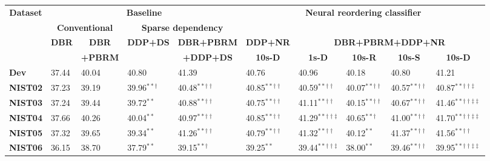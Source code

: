 \documentclass[letterpaper]{article}
\begin{document}
\begin{table}[ht]
\centering
\small
\begin{tabular}{|l|l|l||l|l||l|l|l|l|l|}
\hline
\multicolumn{1}{|c|}{\multirow{4}{*}{\bf Dataset}} & \multicolumn{4}{c||}{\bf Baseline} & \multicolumn{5}{c|}{\multirow{2}{*}{\bf Neural reordering classifier}} \\\cline{2-5}
 & \multicolumn{2}{c||}{\bf Conventional} & \multicolumn{2}{c||}{\bf Sparse dependency} &  \multicolumn{5}{c|}{} \\\cline{2-10}
 & \multicolumn{1}{c|}{\multirow{2}{*}{\bf DBR}} & \multicolumn{1}{c||}{\bf DBR} & \multicolumn{1}{c|}{\multirow{2}{*}{\bf DDP+DS}} & \multicolumn{1}{c||}{\bf DBR+PBRM} & \multicolumn{1}{c|}{\bf DDP+NR} & \multicolumn{4}{c|}{\bf DBR+PBRM+DDP+NR} \\\cline{6-10}
 & & \multicolumn{1}{c||}{\bf +PBRM} & & \multicolumn{1}{c||}{\bf +DDP+DS} & \multicolumn{1}{c|}{\bf 10s-D} & \multicolumn{1}{c|}{\bf 1s-D} & \multicolumn{1}{c|}{\bf 10s-R} & \multicolumn{1}{c|}{\bf 10s-S} & \multicolumn{1}{c|}{\bf 10s-D}\\
\hline\hline
{\bf Dev} & 37.44 & 40.04 & 40.80 & 41.39 & 40.76 & 40.96 & 40.18 & 40.80 & 41.21\\\hline
\hline
{\bf NIST02} & 37.23 & 39.19 & 39.96$^{**\dagger}$ & 40.48$^{**\dagger\dagger}$ & 40.85$^{**\dagger\dagger}$ & 40.59$^{**\dagger\dagger}$ & 40.07$^{**\dagger\dagger}$ & 40.57$^{**\dagger\dagger}$ & 40.87$^{**\dagger\dagger\ddagger}$\\\hline
{\bf NIST03} & 37.24 & 39.44 & 39.72$^{**}$ & 40.88$^{**\dagger\dagger}$ & 40.75$^{**\dagger\dagger}$ & 41.11$^{**\dagger\dagger}$ & 40.15$^{**\dagger\dagger}$ & 40.67$^{**\dagger\dagger}$ & 41.46$^{**\dagger\dagger\ddagger\ddagger}$\\\hline
{\bf NIST04} & 37.66 & 40.26 & 40.04$^{**}$ & 40.97$^{**\dagger\dagger}$ & 40.85$^{**\dagger\dagger}$ & 41.29$^{**\dagger\dagger\ddagger}$ & 40.65$^{**\dagger}$ & 41.00$^{**\dagger\dagger}$ & 41.70$^{**\dagger\dagger\ddagger\ddagger}$\\\hline
{\bf NIST05} & 37.32 & 39.65 & 39.34$^{**}$ & 41.26$^{**\dagger\dagger}$ & 40.79$^{**\dagger\dagger}$ & 41.32$^{**\dagger\dagger}$ & 40.12$^{**}$ & 41.37$^{**\dagger\dagger}$ & 41.56$^{**\dagger\dagger}$\\\hline
{\bf NIST06} & 36.15 & 38.70 & 37.79$^{**}$ & 39.15$^{**\dagger}$ & 39.25$^{**}$ & 39.44$^{**\dagger\dagger\ddagger}$ & 38.00$^{**}$ & 39.46$^{**\dagger\dagger}$ & 39.95$^{**\dagger\dagger\ddagger\ddagger}$\\\hline

\end{tabular}
\end{table}
\end{document}
